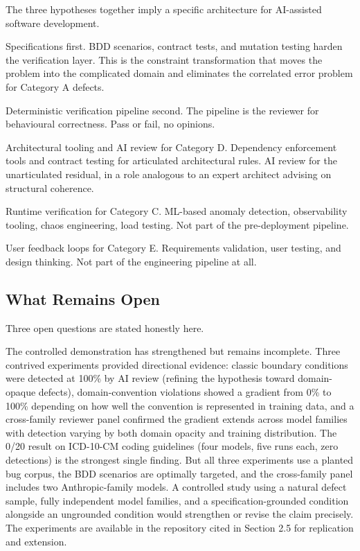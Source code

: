\documentclass{article}
\begin{document}
The three hypotheses together imply a specific architecture for
AI-assisted software development.

Specifications first. BDD scenarios, contract tests, and mutation testing
harden the verification layer. This is the constraint transformation that
moves the problem into the complicated domain and eliminates the correlated
error problem for Category A defects.

Deterministic verification pipeline second. The pipeline is the reviewer
for behavioural correctness. Pass or fail, no opinions.

Architectural tooling and AI review for Category D. Dependency
enforcement tools and contract testing for articulated architectural
rules. AI review for the unarticulated residual, in a role analogous
to an expert architect advising on structural coherence.

Runtime verification for Category C. ML-based anomaly detection,
observability tooling, chaos engineering, load testing. Not part of the
pre-deployment pipeline.

User feedback loops for Category E. Requirements validation, user testing,
and design thinking. Not part of the engineering pipeline at all.

\subsection{What Remains Open}

Three open questions are stated honestly here.

The controlled demonstration has strengthened but remains incomplete. Three
contrived experiments provided directional evidence: classic boundary
conditions were detected at 100\% by AI review (refining the hypothesis
toward domain-opaque defects), domain-convention violations showed a
gradient from 0\% to 100\% depending on how well the convention is
represented in training data, and a cross-family reviewer panel confirmed
the gradient extends across model families with detection varying by both
domain opacity and training distribution. The 0/20 result on ICD-10-CM
coding guidelines (four models, five runs each, zero detections) is the
strongest single finding. But all three experiments use a planted bug
corpus, the BDD scenarios are optimally targeted, and the cross-family
panel includes two Anthropic-family models. A controlled study using a
natural defect sample, fully independent model families, and a
specification-grounded condition alongside an ungrounded condition would
strengthen or revise the claim precisely. The experiments are available in the repository cited in Section 2.5
for replication and extension.
\end{document}
